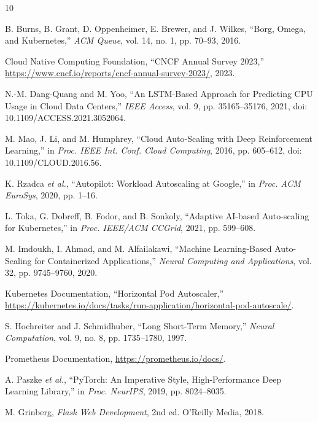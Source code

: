 \documentclass[journal]{IEEEtran}
\begin{document}
\begin{thebibliography}{10}

B. Burns, B. Grant, D. Oppenheimer, E. Brewer, and J. Wilkes, ``Borg, Omega, and Kubernetes,'' \textit{ACM Queue}, vol. 14, no. 1, pp. 70--93, 2016.

Cloud Native Computing Foundation, ``CNCF Annual Survey 2023,'' \url{https://www.cncf.io/reports/cncf-annual-survey-2023/}, 2023.

N.-M. Dang-Quang and M. Yoo, ``An LSTM-Based Approach for Predicting CPU Usage in Cloud Data Centers,'' \textit{IEEE Access}, vol. 9, pp. 35165--35176, 2021, doi: 10.1109/ACCESS.2021.3052064.

M. Mao, J. Li, and M. Humphrey, ``Cloud Auto-Scaling with Deep Reinforcement Learning,'' in \textit{Proc. IEEE Int. Conf. Cloud Computing}, 2016, pp. 605--612, doi: 10.1109/CLOUD.2016.56.

K. Rzadca \textit{et al.}, ``Autopilot: Workload Autoscaling at Google,'' in \textit{Proc. ACM EuroSys}, 2020, pp. 1--16.

L. Toka, G. Dobreff, B. Fodor, and B. Sonkoly, ``Adaptive AI-based Auto-scaling for Kubernetes,'' in \textit{Proc. IEEE/ACM CCGrid}, 2021, pp. 599--608.

M. Imdoukh, I. Ahmad, and M. Alfailakawi, ``Machine Learning-Based Auto-Scaling for Containerized Applications,'' \textit{Neural Computing and Applications}, vol. 32, pp. 9745--9760, 2020.

Kubernetes Documentation, ``Horizontal Pod Autoscaler,'' \url{https://kubernetes.io/docs/tasks/run-application/horizontal-pod-autoscale/}.

S. Hochreiter and J. Schmidhuber, ``Long Short-Term Memory,'' \textit{Neural Computation}, vol. 9, no. 8, pp. 1735--1780, 1997.

Prometheus Documentation, \url{https://prometheus.io/docs/}.

A. Paszke \textit{et al.}, ``PyTorch: An Imperative Style, High-Performance Deep Learning Library,'' in \textit{Proc. NeurIPS}, 2019, pp. 8024--8035.

M. Grinberg, \textit{Flask Web Development}, 2nd ed. O'Reilly Media, 2018.


\end{thebibliography}
\end{document}

